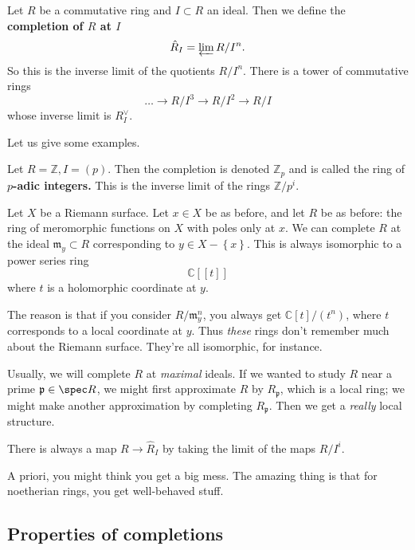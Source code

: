 \begin{definition} 
Let $R$ be a commutative ring and $I \subset R$ an ideal. Then we define the
\textbf{completion of $R$ at $I$}
\[ \hat{R}_I = \varprojlim R/I^n.  \]
So this is the inverse limit of the quotients $R/I^n$. There is a tower of
commutative rings
\[ \dots \to  R/I^3 \to R/I^2 \to R/I   \]
whose inverse limit is $R^{\vee}_I$. 
\end{definition} 

Let us give some examples.
\begin{example} 
Let $R = \mathbb{Z}, I = (p)$. Then the completion is denoted $\mathbb{Z}_p$
and is called the ring of \textbf{$p$-adic integers.} This is the inverse limit
of the rings $\mathbb{Z}/p^i$. 
\end{example} 

\begin{example} 
Let $X$ be a Riemann surface. Let $ x \in X$ be as before, and let $R$ be as
before: the ring of meromorphic functions on $X$ with poles only at $x$. We can
complete $R$ at the ideal $\mathfrak{m}_y \subset R$ corresponding to $y \in X - \left\{x\right\}$. This
is always isomorphic to a power series ring
\[ \mathbb{C}[[t]]  \]
where $t$ is a holomorphic coordinate at $y$. 

The reason is that if you consider $R/\mathfrak{m}_y^n$, you always get
$\mathbb{C}[t]/(t^n)$, where $t$ corresponds to a local coordinate at $y$. Thus
\emph{these} rings don't remember much about the Riemann surface. They're all
isomorphic, for instance. 
\end{example} 

\begin{remark} 
Usually, we will complete $R$ at \emph{maximal} ideals.
If we wanted to study $R$ near a prime $\mathfrak{p} \in \spec R$, we might
first approximate $R$ by $R_{\mathfrak{p}}$, which is a local ring; we might
make another approximation by completing $R_{\mathfrak{p}}$. Then we get a
\emph{really} local structure. 
\end{remark} 

\begin{remark} 
There is always a map $R \to \hat{R}_I$ by taking the limit of the maps $R/I^i$.
\end{remark} 

A priori, you might think you get  a big mess. The amazing thing is that for
noetherian rings, you get well-behaved stuff.

\subsection{Properties of completions}

